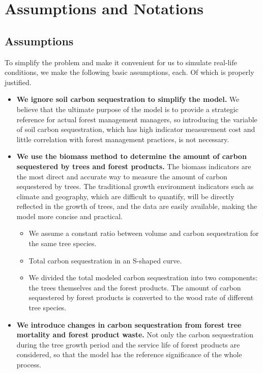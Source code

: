 
\section{Assumptions and Notations}
\subsection{Assumptions}
To simplify the problem and make it convenient for us to simulate real-life conditions, we make the following basic assumptions, each. Of which is properly justified.
\begin{itemize}
\item \textbf {We ignore soil carbon sequestration to simplify the model. }We believe that the ultimate purpose of the model is to provide a strategic reference for actual forest management managers, so introducing the variable of soil carbon sequestration, which has high indicator measurement cost and little correlation with forest management practices, is not necessary.
\item \textbf {We use the biomass method to determine the amount of carbon sequestered by trees and forest products.  }The biomass indicators are the most direct and accurate way to measure the amount of carbon sequestered by trees. The traditional growth environment indicators such as climate and geography, which are difficult to quantify, will be directly reflected in the growth of trees, and the data are easily available, making the model more concise and practical.
  \begin{itemize}
  \item We assume a constant ratio between volume and carbon sequestration for the same tree species.
  \item Total carbon sequestration in an S-shaped curve.
  \item We divided the total modeled carbon sequestration into two components: the trees themselves and the forest products. The amount of carbon sequestered by forest products is converted to the wood rate of different tree species.
  \end{itemize}
\item \textbf {We introduce changes in carbon sequestration from forest tree mortality and forest product waste.   }Not only the carbon sequestration during the tree growth period and the service life of forest products are considered, so that the model has the reference significance of the whole process.

\end{itemize}
